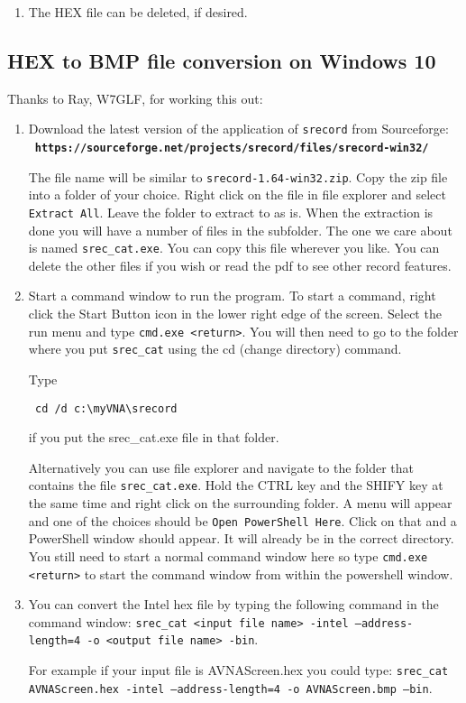 \begin{description}
\begin{enumerate}
\item The HEX file can be deleted, if desired.
\end{enumerate}

\subsection{HEX to BMP file conversion on Windows 10}  Thanks to Ray, W7GLF, for working this out:
\begin{enumerate}
 \item Download the latest version of the application of \texttt{srecord} from Sourceforge:
{\footnotesize\ \textbf{\texttt{https://sourceforge.net/projects/srecord/files/srecord-win32/}}}


The file name will be similar to \texttt{srecord-1.64-win32.zip}.  Copy the zip file into a folder of your choice.  Right click on the file in file explorer and select \texttt{Extract All}.  Leave the folder to extract to as is.  When the extraction is done you will have a number of files in the subfolder.  The one we care about is named \texttt{srec\_cat.exe}.  You can copy this file wherever you like.  You can delete the other files if you wish or read the pdf to see other record features.

\item Start a command window to run the program.  To start a command, right click the Start Button icon in the lower right edge of the screen.  Select the run menu and type \texttt{cmd.exe <return>}.  You will then need to go to the folder where you put \texttt{srec\_cat} using the cd (change directory) command.

Type \begin{verbatim} cd /d c:\myVNA\srecord\end{verbatim} if you put the srec\_cat.exe file in that folder.

Alternatively you can use file explorer and navigate to the folder that contains the file \texttt{srec\_cat.exe}.  Hold the CTRL key and the SHIFY key at the same time and right click on the surrounding folder.  A menu will appear and one of the choices should be \texttt{Open PowerShell Here}.  Click on that and a PowerShell window should appear.  It will already be in the correct directory.  You still need to start a normal command window here so type \texttt{cmd.exe <return>} to start the command window from within the powershell window.

\item You can convert the Intel hex file by typing the following command in the command window:  \texttt{srec\_cat  <input file name> -intel --address-length=4 -o <output file name>  -bin}.

For example if your input file is AVNAScreen.hex you could type: \texttt{srec\_cat  AVNAScreen.hex -intel --address-length=4 -o AVNAScreen.bmp –bin}.
\end{enumerate}
\end{description}

